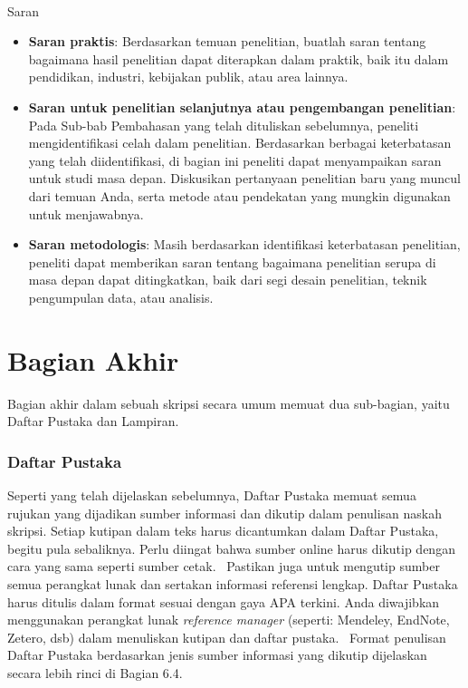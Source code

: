 \documentclass[
  indonesian,
  letterpaper,
]{scrbook}
\makeatletter
\let\oldparagraph\paragraph
\renewcommand{\paragraph}{
    \@ifstar
      \xxxParagraphStar
      \xxxParagraphNoStar
  }
\newcommand{\xxxParagraphStar}[1]{\oldparagraph*{#1}\mbox{}}
\newcommand{\xxxParagraphNoStar}[1]{\oldparagraph{#1}\mbox{}}
\providecommand{\tightlist}{%
  \setlength{\itemsep}{0pt}\setlength{\parskip}{0pt}}
\makeatother
\begin{document}
\paragraph{Saran}\label{saran}

\begin{itemize}
\tightlist
\item
  \textbf{Saran praktis}: Berdasarkan temuan penelitian, buatlah saran
  tentang bagaimana hasil penelitian dapat diterapkan dalam praktik,
  baik itu dalam pendidikan, industri, kebijakan publik, atau area
  lainnya.
\item
  \textbf{Saran untuk penelitian selanjutnya atau pengembangan
  penelitian}: Pada Sub-bab Pembahasan yang telah dituliskan sebelumnya,
  peneliti mengidentifikasi celah dalam penelitian. Berdasarkan berbagai
  keterbatasan yang telah diidentifikasi, di bagian ini peneliti dapat
  menyampaikan saran untuk studi masa depan. Diskusikan pertanyaan
  penelitian baru yang muncul dari temuan Anda, serta metode atau
  pendekatan yang mungkin digunakan untuk menjawabnya.
\item
  \textbf{Saran metodologis}: Masih berdasarkan identifikasi
  keterbatasan penelitian, peneliti dapat memberikan saran tentang
  bagaimana penelitian serupa di masa depan dapat ditingkatkan, baik
  dari segi desain penelitian, teknik pengumpulan data, atau analisis.
\end{itemize}

\section{Bagian Akhir}\label{bagian-akhir}

Bagian akhir dalam sebuah skripsi secara umum memuat dua sub-bagian,
yaitu Daftar Pustaka dan Lampiran.

\subsubsection{Daftar Pustaka}\label{daftar-pustaka-1}

Seperti yang telah dijelaskan sebelumnya, Daftar Pustaka memuat semua
rujukan yang dijadikan sumber informasi dan dikutip dalam penulisan
naskah skripsi. Setiap kutipan dalam teks harus dicantumkan dalam Daftar
Pustaka, begitu pula sebaliknya. Perlu diingat bahwa sumber online harus
dikutip dengan cara yang sama seperti sumber cetak.~ Pastikan juga untuk
mengutip sumber semua perangkat lunak dan sertakan informasi referensi
lengkap. Daftar Pustaka harus ditulis dalam format sesuai dengan gaya
APA terkini. Anda diwajibkan menggunakan perangkat lunak \emph{reference
manager} (seperti: Mendeley, EndNote, Zetero, dsb) dalam menuliskan
kutipan dan daftar pustaka.~ Format penulisan Daftar Pustaka berdasarkan
jenis sumber informasi yang dikutip dijelaskan secara lebih rinci di
Bagian 6.4.
\end{document}
